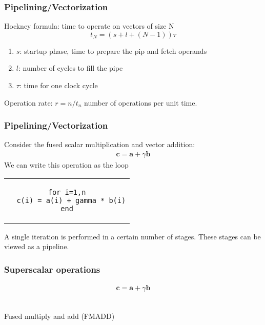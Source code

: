 \begin{frame}[fragile]
  \frametitle{Pipelining/Vectorization}

Hockney formula: time to operate on vectors of size N
\begin{equation*}
t_N = (s + l + (N - 1)) \tau
\end{equation*}

\medskip
\begin{enumerate}
\item $s$: startup phase, time to prepare the pip and fetch operands
\item $l$: number of cycles to fill the pipe
\item $\tau$: time for one clock cycle
\end{enumerate}

\medskip
Operation rate: $r = n / t_n$ number of operations per unit time.

\end{frame}

\begin{frame}[fragile]
  \frametitle{Pipelining/Vectorization}
  Consider the fused scalar multiplication and vector addition:
  \begin{align*}
    \bm c = \bm a + \gamma \bm b
  \end{align*}
  We can write this operation as the loop
  \begin{center}
    \begin{tabular}{c}
\begin{lstlisting}[style=fortran]
for i=1,n
  c(i) = a(i) + gamma * b(i)
end
\end{lstlisting}
    \end{tabular}
  \end{center}
  A single iteration is performed in a certain number of stages. These stages
  can be viewed as a pipeline.
\end{frame}

\begin{frame}
  \frametitle{Superscalar operations}
  \begin{align*}
    \bm c = \bm a + \gamma \bm b
  \end{align*}

  \begin{center}
     \\
    Fused multiply and add (FMADD)
  \end{center}
\end{frame}

